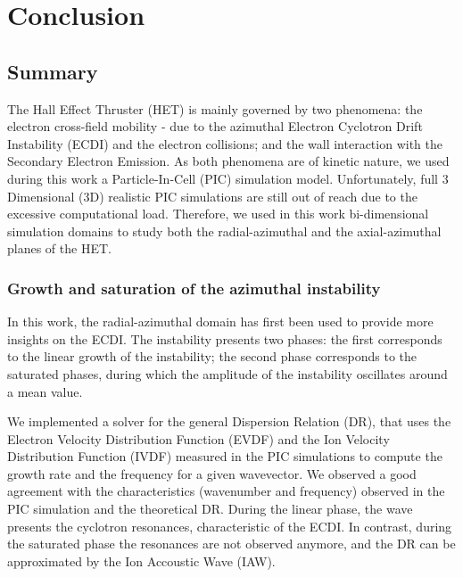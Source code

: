
\chapter{Conclusion}
\label{ch-conclusion}

\section{Summary}

The Hall Effect Thruster (HET) is mainly governed by two phenomena\string: the electron cross-field mobility - due to the azimuthal Electron Cyclotron Drift Instability (ECDI) and the electron collisions; and the wall interaction with the Secondary Electron Emission.
As both phenomena are of kinetic nature, we used during this work a Particle-In-Cell (PIC) simulation model.
Unfortunately, full 3 Dimensional (3D) realistic PIC simulations are still out of reach due to the excessive computational load.
Therefore, we used in this work bi-dimensional simulation domains to study both the radial-azimuthal and the axial-azimuthal planes of the HET.

\subsection{Growth and saturation of the azimuthal instability}

In this work, the radial-azimuthal domain has first been used to provide more insights on the \ac{ECDI}.
The instability presents two phases\string: the first corresponds to the linear growth of the instability; the second phase corresponds to the saturated phases, during which the amplitude of the instability oscillates around a mean value.

We implemented a solver for the general Dispersion Relation (DR), that uses the Electron Velocity Distribution Function (EVDF) and the Ion Velocity Distribution Function (IVDF) measured in the PIC simulations to compute the growth rate and the frequency for a given wavevector.
We observed a good agreement with the characteristics (wavenumber and frequency) observed in the \ac{PIC} simulation and the theoretical DR.
During the linear phase, the wave presents the cyclotron resonances, characteristic of the ECDI.
In contrast, during the saturated phase the resonances are not observed anymore, and the DR can be approximated by the Ion Accoustic Wave (IAW).

